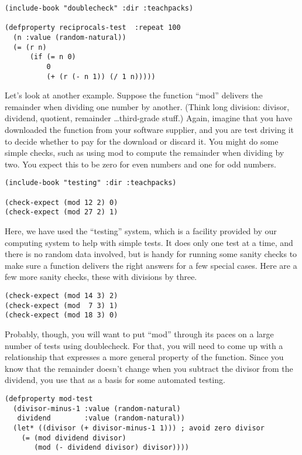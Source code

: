 \begin{lstlisting}
(include-book "doublecheck" :dir :teachpacks)

(defproperty reciprocals-test  :repeat 100
  (n :value (random-natural))
  (= (r n)
      (if (= n 0)
          0
          (+ (r (- n 1)) (/ 1 n)))))
\end{lstlisting}

Let's look at another example.
\label{mod-function}
Suppose the function ``mod''
delivers the remainder when dividing one number by another.
(Think long division: divisor, dividend, quotient, remainder \dots third-grade stuff.)
Again, imagine that you have downloaded the function from your software supplier, and you are test driving it to decide whether to pay for the download or discard it. You might do some simple checks, such as using mod to compute the remainder when dividing by two. You expect this to be zero for even numbers and one for odd numbers.

\begin{lstlisting}
(include-book "testing" :dir :teachpacks)

(check-expect (mod 12 2) 0)
(check-expect (mod 27 2) 1)
\end{lstlisting}

Here, we have used the ``testing'' system, which is
a facility provided by our computing system to help with simple tests.
It does only one test at a time, and there is no random data involved,
but is handy for running some sanity checks
to make sure a function delivers the right answers for a few special cases.
Here are a few more sanity checks, these with divisions by three.

\begin{lstlisting}
(check-expect (mod 14 3) 2)
(check-expect (mod  7 3) 1)
(check-expect (mod 18 3) 0)
\end{lstlisting}

Probably, though, you will want to put ``mod''
through its paces on a large number of tests using doublecheck.
For that, you will need to come up with a relationship
that expresses a more general property of the function.
Since you know that the remainder doesn't change
when you subtract the divisor from the dividend,
you use that as a basis for some automated testing.

\begin{lstlisting}
(defproperty mod-test
  (divisor-minus-1 :value (random-natural)
   dividend        :value (random-natural))
  (let* ((divisor (+ divisor-minus-1 1))) ; avoid zero divisor
    (= (mod dividend divisor)
       (mod (- dividend divisor) divisor))))
\end{lstlisting}

